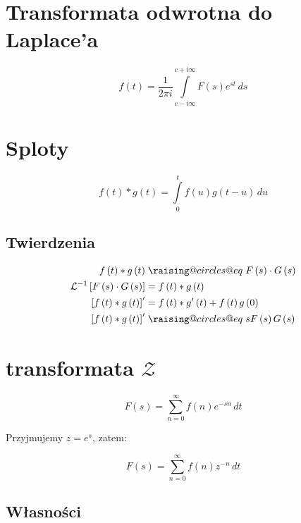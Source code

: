 \documentclass[a4paper,12pt]{article}
\makeatletter
\newcommand{\odpowiada}{\mathrel{\mathpalette\raising@circles@eq\relax}}
\newcommand{\raising@circles@eq}[2]{%
  \vphantom{#1+}%
  \vbox{
    \settowidth\unitlength{$#1\mspace{2mu}$}%
    \offinterlineskip\m@th
    \ialign{##\cr
      \hfil\small@circle{#1}$#1\mspace{1.5mu}$\cr\noalign{\vskip0.5\unitlength}
      $#1=$\cr\noalign{\post@vskip{+}{#1}}
      $#1\mspace{1.5mu}$\small@circle{#1}\hfill\cr\noalign{\post@vskip{-}{#1}}
    }%
  }%
}
\newcommand{\small@circle}[1]{%
  \smash{%
    \begin{picture}(1,1)
    \small@linethickness{#1}
    \put(0.5,0.5){\circle{1}}
    \end{picture}%
  }%
}
\newcommand{\small@linethickness}[1]{%
  \linethickness{%
      \ifx#1\displaystyle 0.8\fontdimen8\textfont3\else
      \ifx#1\textstyle 0.8\fontdimen8\textfont3\else
      \ifx#1\scriptstyle0.8\fontdimen8\scriptfont3\else
      1\fontdimen8\scriptscriptfont3\fi\fi\fi
  }%
}
\newcommand{\post@vskip}[2]{%
  \expandafter\vskip\expanded{%
    #1\ifx#2\scriptscriptstyle0.9\else\ifx#2\scriptstyle0.6\else0.3\fi\fi\unitlength
  }%
}
\makeatother
\begin{document}
\begin{multicols}{2}
\section{Transformata odwrotna do Laplace'a}

    \[
        f\left(t\right) = \frac{1}{2 \pi i} \int \limits^{c + i\infty}_{c - i\infty} F \left( s \right) e^{s t} \, ds
    \]

\section{Sploty}

    \[
        f\left( t \right) * g\left( t \right) = \int \limits^t_0 f \left( u \right) g \left(t - u \right)\, du
    \]

    \subsection*{Twierdzenia}

    \begin{align*}
        f \left( t \right) * g \left( t \right) &\odpowiada F\left(s\right) \cdot G \left(s\right) \\
        \mathcal{L}^{ - 1} \left[ F \left( s \right) \cdot G \left( s \right) \right] &= f \left( t \right) * g \left( t \right) \\
        \left[ f \left(t\right) * g \left( t \right)\right]' &= f \left(t\right) * g' \left( t \right) + f \left( t \right) g \left( 0 \right) \\
        \left[ f \left(t\right) * g \left( t \right)\right]' &\odpowiada s F\left( s \right) G \left( s \right) \\
    \end{align*}

\section{transformata $\mathcal{Z}$}

\[
    F \left( s \right) = \sum \limits^\infty_{n = 0} f \left(n\right) e^{ - s n}\, dt
\]

Przyjmujemy $z = e^s$, zatem:

\[
    F \left( s \right) = \sum \limits^\infty_{n = 0} f \left(n\right) z^{ - n}\, dt
\]

\subsection*{Własności}


\end{multicols}
\end{document}
